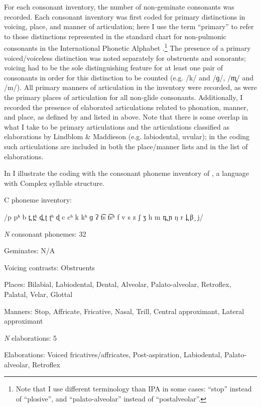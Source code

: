   For each consonant inventory, the number of non-geminate consonants was recorded. Each consonant inventory was first coded for primary distinctions in voicing, place, and manner of articulation; here I use the term ``primary'' to refer to those distinctions represented in the standard chart for non-pulmonic consonants in the International Phonetic Alphabet \citep{IPA2015}.\footnote{{Note that I use different terminology than IPA in some cases: ``stop'' instead of ``plosive'', and ``palato-alveolar'' instead of ``postalveolar''.}} The presence of a primary voiced/voiceless distinction was noted separately for obstruents and sonorants; voicing had to be the sole distinguishing feature for at least one pair of consonants in order for this distinction to be counted (e.g. /k/ and /ɡ/, /m̥/ and /m/). All primary manners of articulation in the inventory were recorded, as were the primary places of articulation for all non-glide consonants. Additionally, I recorded the presence of elaborated articulations related to phonation, manner, and place, as defined by \citet{LindblomMaddieson1988} and listed in  above. Note that there is some overlap in what I take to be primary articulations and the articulations classified as elaborations by Lindblom \& Maddieson (e.g. labiodental, uvular); in the coding such articulations are included in both the place/manner lists and in the list of elaborations.

  In  I illustrate the coding with the consonant phoneme inventory of , a language with Complex syllable structure.

\ea\label{ex:4.10}
\begin{Coding}
\item[C phoneme inventory:] 
\item[] /p pʰ b t̪ t̪ʰ d̪ ʈ ʈʰ ɖ c cʰ k kʰ ɡ ʔ t͡s t͡sʰ f v s z ʃ ʒ h m n̪ ɲ ŋ r l̪ β ̞ j/

\item[\textit{N} consonant phonemes:] 32

\item[Geminates:] N/A

\item[Voicing contrasts:] Obstruents

\item[Places:] Bilabial, Labiodental, Dental, Alveolar, Palato-alveolar, Retroflex, Palatal, Velar, Glottal

\item[Manners:] Stop, Affricate, Fricative, Nasal, Trill, Central approximant, Lateral approximant

\item[\textit{N} elaborations:] 5

\item[Elaborations:] Voiced fricatives/affricates, Post-aspiration, Labiodental, Palato-alveolar, Retroflex
\end{Coding}
\z


